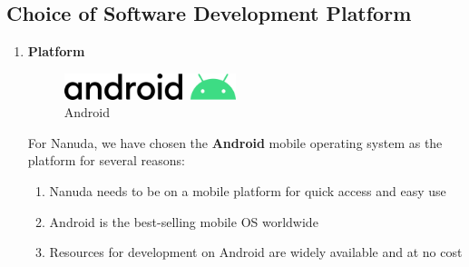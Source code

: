 \documentclass[conference]{IEEEtran}
\begin{document}
\subsection{Choice of Software Development Platform}
\begin{enumerate}
    \item \textbf{Platform}
        \newline
        \begin{figure}[htbp]
            \centerline{\includegraphics[width=50mm,scale=0.5]{img/logo-android.png}}
            \caption{Android}
            \label{fig:android-logo}
        \end{figure}
        \newline
        For Nanuda, we have chosen the \textbf{Android} mobile operating system as the platform for several reasons:
        \begin{enumerate}
            \item Nanuda needs to be on a mobile platform for quick access and easy use
            \item Android is the best-selling mobile OS worldwide
            \item Resources for development on Android are widely available and at no cost
        \end{enumerate}
        

\end{enumerate}
\end{document}
